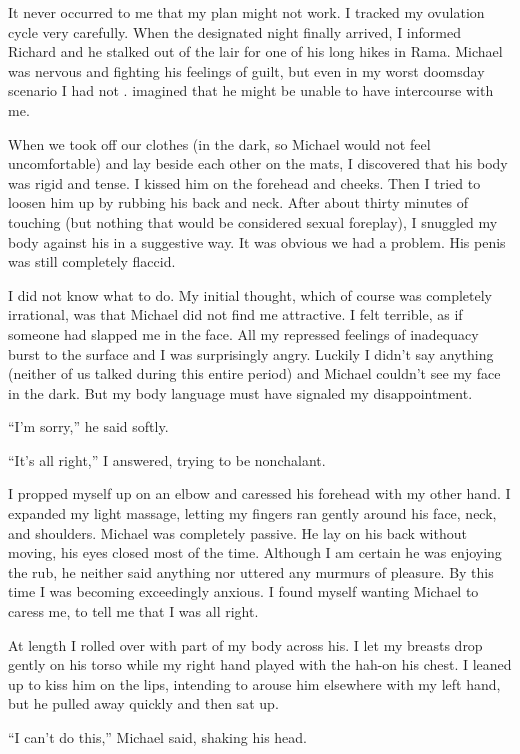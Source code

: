 \documentclass[]{article}
\begin{document}
It never occurred to me that my plan might not work. I tracked my ovulation cycle very carefully. When the designated night finally arrived, I informed Richard and he stalked out of the lair for one of his long hikes in Rama. Michael was nervous and fighting his feelings of guilt, but even in my worst doomsday scenario I had not . imagined that he might be unable to have intercourse with me.

When we took off our clothes (in the dark, so Michael would not feel uncomfortable) and lay beside each other on the mats, I discovered that his body was rigid and tense. I kissed him on the forehead and cheeks. Then I tried to loosen him up by rubbing his back and neck. After about thirty minutes of touching (but nothing that would be considered sexual foreplay), I snuggled my body against his in a suggestive way. It was obvious we had a problem. His penis was still completely flaccid.

I did not know what to do. My initial thought, which of course was completely irrational, was that Michael did not find me attractive. I felt terrible, as if someone had slapped me in the face. All my repressed feelings of inadequacy burst to the surface and I was surprisingly angry. Luckily I didn’t say anything (neither of us talked during this entire period) and Michael couldn’t see my face in the dark. But my body language must have signaled my disappointment.

“I’m sorry,” he said softly.

“It’s all right,” I answered, trying to be nonchalant.

I propped myself up on an elbow and caressed his forehead with my other hand. I expanded my light massage, letting my fingers ran gently around his face, neck, and shoulders. Michael was completely passive. He lay on his back without moving, his eyes closed most of the time. Although I am certain he was enjoying the rub, he neither said anything nor uttered any murmurs of pleasure. By this time I was becoming exceedingly anxious. I found myself wanting Michael to caress me, to tell me that I was all right.

At length I rolled over with part of my body across his. I let my breasts drop gently on his torso while my right hand played with the hah-on his chest. I leaned up to kiss him on the lips, intending to arouse him elsewhere with my left hand, but he pulled away quickly and then sat up.

“I can’t do this,” Michael said, shaking his head.
\end{document}
